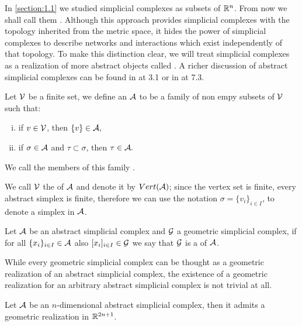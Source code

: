 \documentclass[../1.tex]{subfiles}
\begin{document}
    In \autoref{section:1.1} we studied simplicial complexes as subsets of $\mathbb{R}^n$. From now we shall call them .
    Although this approach provides simplicial complexes with the topology inherited from the metric space, it hides the power of simplicial complexes 
    to describe networks and interactions which exist independently of that topology. To make this distinction clear, we will treat
    simplicial complexes as a realization of more abstract objects called . A richer discussion of abstract simplicial complexes
    can be found in \cite{comptop} at 3.1 or in \cite{rotman} at 7.3.
    
    \begin{defn}
        \label{def:1:2:1}
        Let $\mathcal{V}$ be a finite set, we define an  $\mathcal{A}$ to be 
        a family of non empy subsets of $\mathcal{V}$ such that:
        \begin{enumerate}[(i)]
            \item if $v \in \mathcal{V}$, then $\{v\} \in \mathcal{A},$
            \item if $\sigma \in \mathcal{A}$ and $\tau \subset \sigma$, then $\tau \in \mathcal{A}.$
        \end{enumerate}
        We call the members of this family .
    \end{defn}
    
    We call $\mathcal{V}$ the  of $\mathcal{A}$ and denote it by $Vert(\mathcal{A})$; since the vertex
    set is finite, every abstract simplex is finite, therefore we can use the notation $\sigma = \{ v_i \}_{i \in I}$, to denote a simplex in $\mathcal{A}$.
    
    \begin{defn}
        Let $\mathcal{A}$ be an abstract simplicial complex and $\mathcal{G}$ a geometric simplicial complex, if for all $\{x_i\}_{i \in I} \in \mathcal{A}$ also $[x_i]_{i \in I} \in \mathcal{G}$
        we say that $\mathcal{G}$ is a  of $\mathcal{A}$.
    \end{defn}

    While every geometric simplicial complex can be thought as a geometric realization of an abstract simplicial complex, the existence of a geometric 
    realization for an arbitrary abstract simplicial complex is not trivial at all.

    \begin{thm}
        \label{thm:2}
        Let $\mathcal{A}$ be an $n$-dimensional abstract simplicial complex, then it admits a geometric realization in $\mathbb{R}^{2n+1}$.
    \end{thm}
\end{document}
